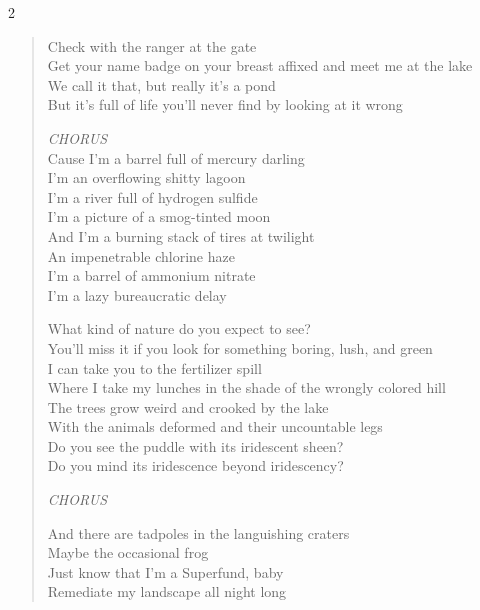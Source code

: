 \documentclass[11pt]{book}
\begin{document}
\begin{multicols}{2}
\begin{verse}
Check with the ranger at the gate \\
Get your name badge on your breast affixed and meet me at the lake \\
We call it that, but really it's a pond \\
But it's full of life you'll never find by looking at it wrong

\hspace{2em} \emph{CHORUS}\\
\hspace{2em} Cause I'm a barrel full of mercury darling \\
\hspace{2em} I'm an overflowing shitty lagoon \\
\hspace{2em} I'm a river full of hydrogen sulfide \\
\hspace{2em} I'm a picture of a smog-tinted moon \\
\hspace{2em} And I'm a burning stack of tires at twilight \\
\hspace{2em} An impenetrable chlorine haze \\
\hspace{2em} I'm a barrel of ammonium nitrate \\
\hspace{2em} I'm a lazy bureaucratic delay

What kind of nature do you expect to see? \\
You'll miss it if you look for something boring, lush, and green \\
I can take you to the fertilizer spill \\
Where I take my lunches in the shade of the wrongly colored hill \\
The trees grow weird and crooked by the lake \\
With the animals deformed and their uncountable legs \\
Do you see the puddle with its iridescent sheen? \\
Do you mind its iridescence beyond iridescency?

\hspace{2em} \emph{CHORUS}

\hspace{2em} And there are tadpoles in the languishing craters \\
\hspace{2em} Maybe the occasional frog \\
\hspace{2em} Just know that I'm a Superfund, baby \\
\hspace{2em} Remediate my landscape all night long


\end{verse}
\end{multicols}
\end{document}
